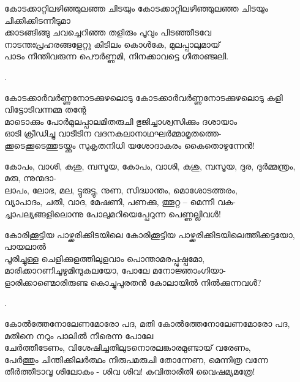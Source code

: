 \begin{enumerate}
\begin{slokam}{\VSv}{\VRV}{കോടക്കാറ്റിലഴിഞ്ഞുലഞ്ഞ ചിടയും}
കോടക്കാറ്റിലഴിഞ്ഞുലഞ്ഞ ചിടയും ചിക്കിക്കിടന്നീടുമാ\\
ക്കാടങ്ങിങ്ങു ചവച്ചെറിഞ്ഞ തളിരും പൂവും പിടഞ്ഞീടവേ\\
നാടന്തഃപ്രഹരങ്ങളേറ്റു കിടിലം കൊള്‍കേ, മുലപ്പാലുമായ്‌\\
പാടം നീന്തിവരുന്ന പൌര്‍ണ്ണമി, നിനക്കാവട്ടെ ഗീതാഞ്ജലി.
\end{slokam}



.


\begin{slokam}{\VSr}{\VenA}{കോടക്കാർവർണ്ണനോടക്കുഴലൊടു}
കോടക്കാർവർണ്ണനോടക്കുഴലൊടു കളി വിട്ടോടിവന്നമ്മ തന്റേ\\
മാടൊക്കും പോർമുലപ്പാലമിതരുചി ഭുജിച്ചാശ്വസിക്കും ദശായാം\\
ഓടി ക്രീഡിച്ചു വാടീടിന വദനകലാനാഥഘർമ്മാമൃതത്തെ-\\
ക്കൂടെക്കൂടെത്തുടയ്ക്കും സുകൃതനിധി യശോദാകരം കൈതൊഴുന്നേൻ!
\end{slokam}


\begin{slokam}{\VSv}{\SVL}{കോപം, വാശി, കുശു, മ്പസൂയ,}
കോപം, വാശി, കുശു, മ്പസൂയ, ദുര, ദുർമ്മന്ത്രം, മരു, ന്നുന്മദാ-\\
ലാപം, ലോഭ, മല, ട്ടുരുട്ടു, നുണ, സിദ്ധാന്തം, മൊശോടത്തരം,\\
വ്യാപാദം, ചതി, വാദ, മേഷണി, പണക്കു, ത്തൂറ്റ -- മെന്നീ വക-\\
ച്ചാപല്യങ്ങളിലൊന്നു പോലുമറിയെപ്പേറുന്ന പെണ്ണല്ലിവള്‍!
\end{slokam}



\begin{slokam}{\VSv}{\VNM}{കോരിക്കൂട്ടിയ പാഴ്ക്കരിക്കിടയിലെ}
കോരിക്കൂട്ടിയ പാഴ്ക്കരിക്കിടയിലെത്തീക്കട്ടയോ, പായലാൽ\\
പൂരിച്ചുള്ള ചെളിക്കുളത്തിലുളവാം പൊന്താമരപ്പുഷ്പമോ,\\
മാരിക്കാറണിചൂഴുമിന്ദുകലയോ, പോലേ മനോജ്ഞാംഗിയാ-\\
ളാരിക്കാണ്മൊരിരുണ്ട കൊച്ചുപുരതൻ കോലായിൽ നിൽക്കുന്നവള്‍?
\end{slokam}

.

\begin{slokam}{\VSr}{\KN}{കോൽത്തേനോലേണമോരോ പദ, മതി}
കോൽത്തേനോലേണമോരോ പദ, മതിനെ നറും പാലിൽ നീരെന്ന പോലേ\\
ചേർത്തീടേണം, വിശേഷിച്ചതിലുടനൊരലങ്കാരമുണ്ടായ്‌ വരേണം,\\
പേർത്തും ചിന്തിക്കിലർത്ഥം നിരുപമരുചി തോന്നേണ, മെന്നിത്ര വന്നേ\\
തീർത്തീടാവൂ ശിലോകം - ശിവ ശിവ! കവിതാരീതി വൈഷമ്യമത്രേ!
\end{slokam}


\end{enumerate}
